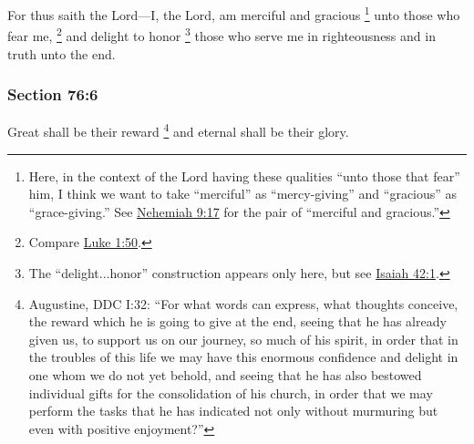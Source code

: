		For thus saith the Lord---I, the Lord, am merciful and gracious%
			\footnote{%
				\label{DC76-5-gracious}%
				Here, in the context of the Lord having these qualities ``unto those that fear'' him, I think we want to take ``merciful'' as ``mercy-giving'' and ``gracious'' as ``grace-giving.'' See \hyperref[NEHEMIAH-9-17]{Nehemiah 9:17} for the pair of ``merciful and gracious.''
				}
		unto those who fear me,%
			\footnote{%
				Compare \hyperref[LUKE-1-50]{Luke 1:50}.
				}
		and delight to honor%
			\footnote{%
				\label{DC76-5-delight}%
				The ``delight...honor'' construction appears only here, but see \hyperref[ISAIAH-42-1]{Isaiah 42:1}.
				}
		those who serve me in righteousness and in truth unto the end.


	\subsubsection{Section 76:6} %
		\label{DC76-6}

		Great shall be their reward%
			\footnote{%
				Augustine, DDC I:32: ``For what words can express, what thoughts conceive, the reward which he is going to give at the end, seeing that he has already given us, to support us on our journey, so much of his spirit, in order that in the troubles of this life we may have this enormous confidence and delight in one whom we do not yet behold, and seeing that he has also bestowed individual gifts for the consolidation of his church, in order that we may perform the tasks that he has indicated not only without murmuring but even with positive enjoyment?''
				}
		and eternal shall be their glory.


